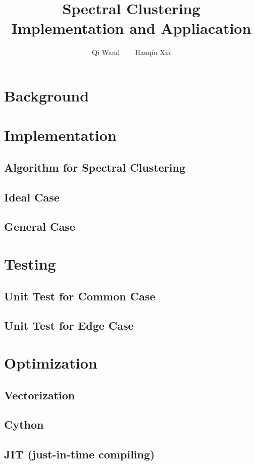 \documentclass[11pt]{article}
\begin{document}
\title{ Spectral Clustering Implementation and Appliacation }
\author{Qi Wand ~~~ Hanqiu Xia}
\maketitle

\section{Background}
\section{Implementation}
\subsection{Algorithm for Spectral Clustering}
\subsection{Ideal Case }
\subsection{General Case}


\section{Testing}
\subsection{Unit  Test for Common Case}
\subsection{Unit Test for Edge Case}

\section{Optimization}

\subsection{Vectorization}
\subsection{Cython}
\subsection{JIT (just-in-time compiling) }
\end{document}
